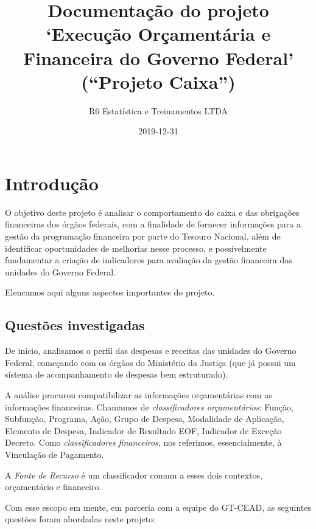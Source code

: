 \documentclass[]{book}
\title{Documentação do projeto `Execução Orçamentária e Financeira do Governo Federal' (``Projeto Caixa'')}
\author{R6 Estatística e Treinamentos LTDA}
\date{2019-12-31}
\begin{document}
\maketitle

{
\setcounter{tocdepth}{1}
\tableofcontents
}
\hypertarget{introducao}{%
\chapter{Introdução}\label{introducao}}

O objetivo deste projeto é analisar o comportamento do caixa e das obrigações financeiras dos órgãos federais, com a finalidade de fornecer informações para a gestão da programação financeira por parte do Tesouro Nacional, além de identificar oportunidades de melhorias nesse processo, e possivelmente fundamentar a criação de indicadores para avaliação da gestão financeira das unidades do Governo Federal.

Elencamos aqui alguns aspectos importantes do projeto.

\hypertarget{questoes-investigadas}{%
\section{Questões investigadas}\label{questoes-investigadas}}

De início, analisamos o perfil das despesas e receitas das unidades do Governo Federal, começando com os órgãos do Ministério da Justiça (que já possui um sistema de acompanhamento de despesas bem estruturado).

A análise procurou compatibilizar as informações orçamentárias com as informações financeiras. Chamamos de \emph{classificadores orçamentários}: Função, Subfunção, Programa, Ação, Grupo de Despesa, Modalidade de Aplicação, Elemento de Despesa, Indicador de Resultado EOF, Indicador de Exceção Decreto. Como \emph{classificadores financeiros}, nos referimos, essencialmente, à Vinculação de Pagamento.

A \emph{Fonte de Recurso} é um classificador comum a esses dois contextos, orçamentário e financeiro.

Com esse escopo em mente, em parceria com a equipe do GT-CEAD, as seguintes questões foram abordadas neste projeto:
\end{document}
